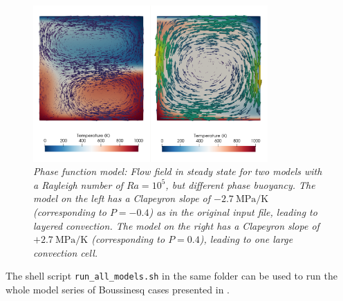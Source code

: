 \begin{figure}
\includegraphics[width=0.8\textwidth]{cookbooks/christensen_yuen_phase_function/doc/flow_field.png}
\caption{\it Phase function model: Flow field in steady state for two models with a Rayleigh number of $Ra = 10^5$, but different phase buoyancy. The model on the left has a Clapeyron slope of $-2.7~\si{\mega\pascal\per\kelvin}$ (corresponding to $P=-0.4$) as in the original input file, leading to layered convection. The model on the right has a Clapeyron slope of $+2.7~\si{\mega\pascal\per\kelvin}$ (corresponding to $P=0.4$), leading to one large convection cell.}
\label{fig:christensen_yuen}
\end{figure}

The shell script \texttt{run\_all\_models.sh} in the same folder can be used to run the whole model series of Boussinesq cases presented in \cite{CY85}.  
